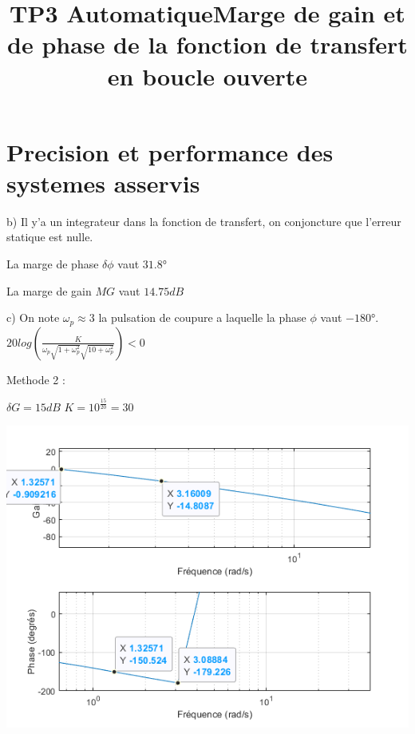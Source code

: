 \documentclass[15pt]{article}
\title{TP3 Automatique}
\begin{document}
\maketitle

\begin{abstract}
\end{abstract}

\section{Precision et performance des systemes asservis}

b) Il y'a un integrateur dans la fonction de transfert, on conjoncture que l'erreur statique est nulle. 

La marge de phase $\delta\phi$ vaut $31.8° $ 

La marge de gain $MG$ vaut $ 14.75dB$

c) On note $\omega_p \approx 3$ la pulsation de coupure a laquelle la phase $\phi$ vaut $-180°$.
$20log(\frac{K}{\omega_p\sqrt{1+\omega_p^2}\sqrt{10+\omega_p^2}}) < 0$


Methode 2 : 

$\delta G = 15dB$
$ K = 10^{\frac{15}{20}} = 30$



\title{Marge de gain et de phase de la fonction de transfert en boucle ouverte}


\includegraphics{marges_de_gain_phase.png}
\end{document}
